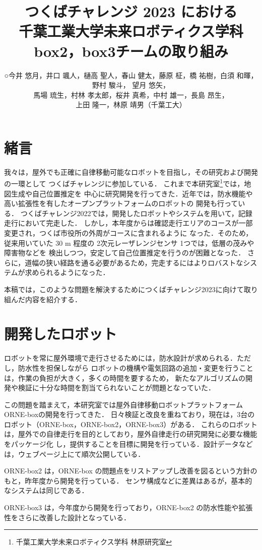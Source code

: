 \documentclass[twocolumn, 9pt]{jsproceedings}
\title{つくばチャレンジ 2023 における\\千葉工業大学未来ロボティクス学科 box2，box3チームの取り組み}
\author{○今井 悠月，井口 颯人，樋高 聖人，春山 健太，藤原 柾，\CID{8705}橋 祐樹，白須 和暉，野村 駿斗，
望月 悠矢，\\馬場 琉生，村林 孝太郎，桜井 真希，中村 雄一，長島 昂生，\\上田 隆一，林原 靖男（千葉工大）}
\affiliation{千葉工業大学未来ロボティクス学科 box2, box3チーム}
\begin{document}
\maketitle

\section{緒言}
我々は，屋外でも正確に自律移動可能なロボットを目指し，その研究および開発の一環として
つくばチャレンジに参加している．
これまで本研究室\footnote{千葉工業大学未来ロボティクス学科 林原研究室}では，地図生成や自己位置推定を
中心に研究開発を行ってきた．近年では，防水機能や高い拡張性を有したオープンプラットフォームのロボットの
開発も行っている．
つくばチャレンジ2022では，開発したロボットやシステムを用いて，記録走行において完走した．
しかし，本年度からは確認走行エリアのコースが一部変更され，つくば市役所の外周がコースに含まれるように
なった．そのため，従来用いていた 30 m 程度の 2次元レーザレンジセンサ 1つでは，低層の茂みや障害物などを
検出しつつ，安定して自己位置推定を行うのが困難となった．
さらに，道幅の狭い経路を通る必要があるため，完走するにはよりロバストなシステムが求められるようになった．

本稿では，このような問題を解決するためにつくばチャレンジ2023に向けて取り組んだ内容を紹介する．

\section{開発したロボット}
ロボットを常に屋外環境で走行させるためには，防水設計が求められる．ただし，防水性を担保しながら
ロボットの機構や電気回路の追加・変更を行うことは，作業の負担が大きく，多くの時間を要するため，
新たなアルゴリズムの開発や検証に十分な時間を割当てられないことが問題となっていた．

この問題を踏まえて，本研究室では屋外自律移動ロボットプラットフォーム ORNE-boxの開発を行ってきた\cite{box}．
日々検証と改良を重ねており，現在は，3台のロボット（ORNE-box，ORNE-box2，ORNE-box3）がある．
これらのロボットは，屋外での自律走行を目的としており，屋外自律走行の研究開発に必要な機能をパッケージ化
し，提供することを目標に開発を行っている．設計データなどは，ウェブページ上にて順次公開している\cite{box-data}．

ORNE-box2 は，ORNE-box の問題点をリストアップし改善を図るという方針のもと，昨年度から開発を行っている．
センサ構成などに差異はあるが，基本的なシステムは同じである．

ORNE-box3 は，今年度から開発を行っており，ORNE-box2 の防水性能や拡張性をさらに改善した設計となっている．
\end{document}
